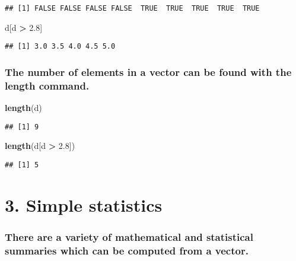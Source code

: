 \documentclass[]{article}
\newenvironment{Shaded}{\begin{snugshade}}{\end{snugshade}}
\newcommand{\KeywordTok}[1]{\textcolor[rgb]{0.13,0.29,0.53}{\textbf{#1}}}
\newcommand{\FloatTok}[1]{\textcolor[rgb]{0.00,0.00,0.81}{#1}}
\newcommand{\StringTok}[1]{\textcolor[rgb]{0.31,0.60,0.02}{#1}}
\newcommand{\OperatorTok}[1]{\textcolor[rgb]{0.81,0.36,0.00}{\textbf{#1}}}
\newcommand{\NormalTok}[1]{#1}
\begin{document}
\begin{verbatim}
## [1] FALSE FALSE FALSE FALSE  TRUE  TRUE  TRUE  TRUE  TRUE
\end{verbatim}

\begin{Shaded}
\begin{Highlighting}[]
\NormalTok{d[d }\OperatorTok{>}\StringTok{ }\FloatTok{2.8}\NormalTok{]}
\end{Highlighting}
\end{Shaded}

\begin{verbatim}
## [1] 3.0 3.5 4.0 4.5 5.0
\end{verbatim}

\subsubsection{The number of elements in a vector can be found with the
length
command.}\label{the-number-of-elements-in-a-vector-can-be-found-with-the-length-command.}

\begin{Shaded}
\begin{Highlighting}[]
\KeywordTok{length}\NormalTok{(d)}
\end{Highlighting}
\end{Shaded}

\begin{verbatim}
## [1] 9
\end{verbatim}

\begin{Shaded}
\begin{Highlighting}[]
\KeywordTok{length}\NormalTok{(d[d }\OperatorTok{>}\StringTok{ }\FloatTok{2.8}\NormalTok{])}
\end{Highlighting}
\end{Shaded}

\begin{verbatim}
## [1] 5
\end{verbatim}

\section{\texorpdfstring{\textbf{3. Simple
statistics}}{3. Simple statistics}}\label{simple-statistics}

\subsubsection{There are a variety of mathematical and statistical
summaries which can be computed from a
vector.}\label{there-are-a-variety-of-mathematical-and-statistical-summaries-which-can-be-computed-from-a-vector.}
\end{document}
